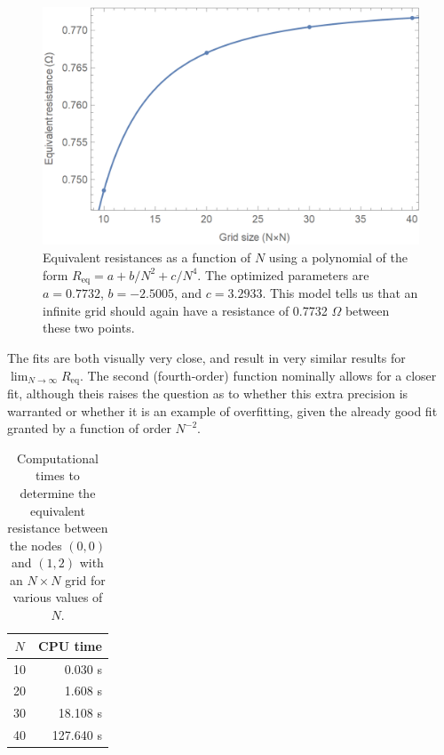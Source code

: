 \documentclass{article}
\begin{document}
\begin{figure}[H]
    \centering
    \includegraphics{homework5/3b.png}
    \caption{Equivalent resistances as a function of $N$ using a polynomial of the form $R_\text{eq}=a+b/N^2+c/N^4$. The optimized parameters are $a=0.7732$, $b=-2.5005$, and $c=3.2933$. This model tells us that an infinite grid should again have a resistance of 0.7732 $\Omega$ between these two points.}
    \label{fig:n4fit}
\end{figure}

The fits are both visually very close, and result in very similar results for $\displaystyle \lim_{N\to\infty}R_\text{eq}$. The second (fourth-order) function nominally allows for a closer fit, although theis raises the question as to whether this extra precision is warranted or whether it is an example of overfitting, given the already good fit granted by a function of order $N^{-2}$.

\bigskip
{}
\medskip

\begin{table}[H]
    \centering
    \begin{tabular}{c|r}
        $N$ & CPU time \\
        \hline 
        10 & 0.030 s \\
        20 & 1.608 s \\
        30 & 18.108 s \\
        40 & 127.640 s
    \end{tabular}
    \caption{Computational times to determine the equivalent resistance between the nodes $(0,0)$ and $(1,2)$ with an $N\times N$ grid for various values of $N$.}
    \label{tab:timing}
\end{table}
\end{document}
